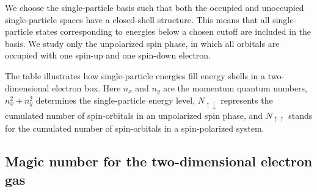 \documentclass[graybox,sectrefs,envcountresetchap,open=right]{svmonodo}
\begin{document}
We choose  the single-particle basis such that both the occupied and 
unoccupied single-particle spaces have a closed-shell 
structure. This means that all single-particle states 
corresponding to energies below a chosen cutoff are
included in the basis. We study only the unpolarized spin
phase, in which all orbitals are occupied with one spin-up 
and one spin-down electron. 


The table illustrates  how single-particle energies
    fill energy shells in a two-dimensional electron box.
  Here $n_{x}$ and $n_{y}$ are the momentum quantum numbers,
  $n_{x}^{2} + n_{y}^{2}$ determines the single-particle 
  energy level, $N_{\uparrow \downarrow }$ represents the 
  cumulated number of spin-orbitals in an unpolarized spin
  phase, and $N_{\uparrow \uparrow }$ stands for the
  cumulated number of spin-orbitals in a spin-polarized
  system.




\subsection{Magic number for the two-dimensional electron gas}
\end{document}
